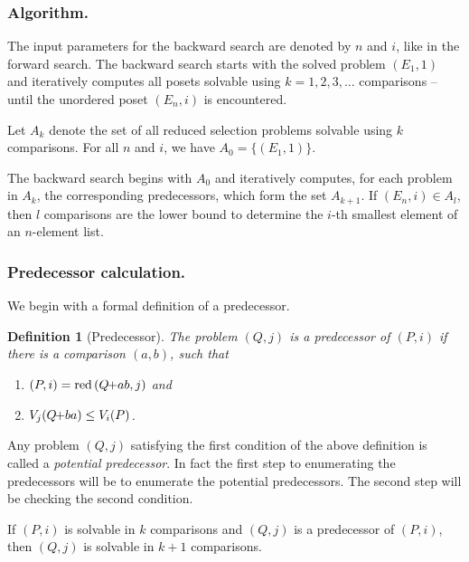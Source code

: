 \documentclass[twoside,leqno,twocolumn]{article}
\newcommand{\pchild}[3]{{#1}\kern-1pt{+}{#2}{#3}}
\newcommand{\reduced}[1]{\operatorname{red}{#1}}
\newtheorem{definition}{Definition}[section]
\begin{document}
\subsubsection{Algorithm.} \label{sec:backward:algorithm}
The input parameters for the backward search are denoted by $n$ and $i$, like in the forward search.
The backward search starts with the solved problem $(E_1, 1)$ and iteratively computes all posets solvable using $k = 1, 2, 3, \dots$ comparisons -- until the unordered poset $(E_n, i)$ is encountered.

Let $A_k$ denote the set of all reduced selection problems solvable using $k$ comparisons.
For all $n$ and $i$, we have $A_0 = \{ (E_1, 1) \}$.

The backward search begins with $A_0$ and iteratively computes, for each problem in $A_k$, the corresponding predecessors, which form the set $A_{k + 1}$.
If $(E_n, i) \in A_l$, then $l$ comparisons are the lower bound to determine the $i$-th smallest element of an $n$-element list.

\subsubsection{Predecessor calculation.} \label{sec:backward:predecessor_calculation}
We begin with a formal definition of a predecessor.

\begin{definition}[Predecessor] \label{definition:predecessor_calculation}
  The problem $(Q, j)$ is a \emph{predecessor} of $(P, i)$ if there is a comparison $(a, b)$, such that
  \begin{enumerate}
    \item $(P, i) = \reduced(\pchild{Q}{a}{b}, j)$ and
    \item $V_j(\pchild{Q}{b}{a}) \le V_i(P)$. %
  \end{enumerate}
\end{definition}

Any problem $(Q, j)$ satisfying the first condition of the above definition is called a \emph{potential predecessor}.
In fact the first step to enumerating the predecessors will be to enumerate the potential predecessors.
The second step will be checking the second condition.

\begin{lemma} \label{lemma:predecessor_calculation}
  If $(P, i)$ is solvable in $k$ comparisons and $(Q, j)$ is a predecessor of $(P, i)$, then $(Q, j)$ is solvable in $k + 1$ comparisons.
\end{lemma}
\end{document}
